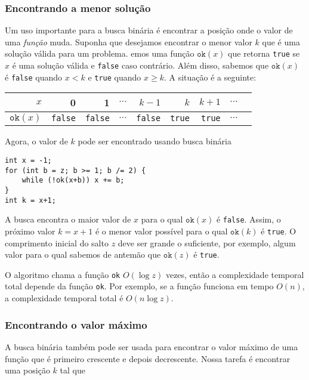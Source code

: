 \subsubsection{Encontrando a menor solução}

Um uso importante para a busca binária é encontrar a posição onde o valor de uma \emph{função} muda.
Suponha que desejamos encontrar o menor valor $k$
que é uma solução válida para um problema.
emos uma função $\texttt{ok}(x)$
que retorna \texttt{true} se $x$ é uma solução válida
e \texttt{false} caso contrário.
Além disso, sabemos que $\texttt{ok}(x)$ é \texttt{false}
quando $x<k$ e \texttt{true} quando $x \ge k$.
A situação é a seguinte:

\begin{center}
\begin{tabular}{r|rrrrrrrr}
$x$ & 0 & 1 & $\cdots$ & $k-1$ & $k$ & $k+1$ & $\cdots$ \\
\hline
$\texttt{ok}(x)$ & \texttt{false} & \texttt{false}
& $\cdots$ & \texttt{false} & \texttt{true} & \texttt{true} & $\cdots$ \\
\end{tabular}
\end{center}

\noindent
Agora, o valor de $k$ pode ser encontrado usando busca binária

\begin{lstlisting}
int x = -1;
for (int b = z; b >= 1; b /= 2) {
    while (!ok(x+b)) x += b;
}
int k = x+1;
\end{lstlisting}

A busca encontra o maior valor de $x$ para o qual
$\texttt{ok}(x)$ é \texttt{false}.
Assim, o próximo valor $k=x+1$
é o menor valor possível para o qual
$\texttt{ok}(k)$ é \texttt{true}.
O comprimento inicial do salto $z$ deve ser grande o suficiente, por exemplo, algum valor para o qual sabemos de antemão que $\texttt{ok}(z)$ é \texttt{true}.

O algoritmo chama a função \texttt{ok}
$O(\log z)$ vezes, então a complexidade temporal total depende da função \texttt{ok}.
Por exemplo, se a função funciona em tempo $O(n)$,
a complexidade temporal total é $O(n \log z)$.

\subsubsection{Encontrando o valor máximo}

A busca binária também pode ser usada para encontrar o valor máximo de uma função que é primeiro crescente e depois decrescente.
Nossa tarefa é encontrar uma posição $k$ tal que

